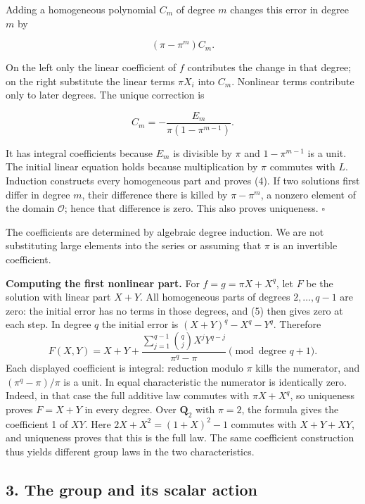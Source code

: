 \documentclass[11pt,a4paper]{article}
\begin{document}
Adding a homogeneous polynomial \(C_m\) of degree \(m\) changes this
error in degree \(m\) by

\[
(\pi-\pi^m)C_m.
\]

On the left only the linear coefficient of \(f\) contributes the change
in that degree; on the right substitute the linear terms \(\pi X_i\)
into \(C_m\). Nonlinear terms contribute only to later degrees. The
unique correction is

\[
C_m=-\frac{E_m}{\pi(1-\pi^{m-1})}.
\tag{5}
\]

It has integral coefficients because \(E_m\) is divisible by \(\pi\) and
\(1-\pi^{m-1}\) is a unit. The initial linear equation holds because
multiplication by \(\pi\) commutes with \(L\). Induction constructs
every homogeneous part and proves (4). If two solutions first differ in
degree \(m\), their difference there is killed by \(\pi-\pi^m\), a
nonzero element of the domain \(\mathcal O\); hence that difference is
zero. This also proves uniqueness. \(\square\)

The coefficients are determined by algebraic degree induction. We are
not substituting large elements into the series or assuming that \(\pi\)
is an invertible coefficient.

\textbf{Computing the first nonlinear part.} For \(f=g=\pi X+X^q\), let
\(F\) be the solution with linear part \(X+Y\). All homogeneous parts of
degrees \(2,\ldots,q-1\) are zero: the initial error has no terms in
those degrees, and (5) then gives zero at each step. In degree \(q\) the
initial error is \((X+Y)^q-X^q-Y^q\). Therefore \[
F(X,Y)=X+Y+
\frac{\displaystyle\sum_{j=1}^{q-1}\binom qj X^jY^{q-j}}
     {\pi^q-\pi}
\pmod{\text{degree }q+1}.
\] Each displayed coefficient is integral: reduction modulo \(\pi\)
kills the numerator, and \((\pi^q-\pi)/\pi\) is a unit. In equal
characteristic the numerator is identically zero. Indeed, in that case
the full additive law commutes with \(\pi X+X^q\), so uniqueness proves
\(F=X+Y\) in every degree. Over \(\mathbf Q_2\) with \(\pi=2\), the
formula gives the coefficient 1 of \(XY\). Here \(2X+X^2=(1+X)^2-1\)
commutes with \(X+Y+XY\), and uniqueness proves that this is the full
law. The same coefficient construction thus yields different group laws
in the two characteristics.

\subsection{3. The group and its scalar
action}\label{the-group-and-its-scalar-action}
\end{document}
